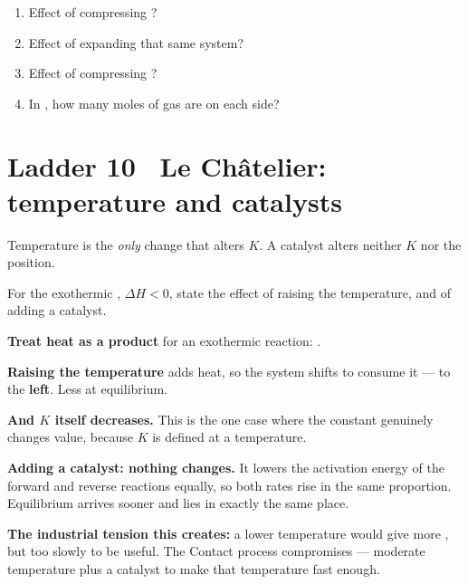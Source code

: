 \documentclass{apchem-worksheet}
\begin{document}
\begin{yourturn}
\begin{enumerate}[leftmargin=*,itemsep=0.5em]
  \item Effect of compressing ?
        \workspace[1.4cm]
  \item Effect of expanding that same system? \workspace[1.4cm]
  \item Effect of compressing ?
        \workspace[1.6cm]
  \item In , how many moles of gas are on
        each side? \workspace[1.6cm]
\end{enumerate}
\end{yourturn}

\section*{\sffamily Ladder 10 \textbullet\ Le Ch\^{a}telier: temperature and catalysts}

Temperature is the \emph{only} change that alters $K$. A catalyst alters
neither $K$ nor the position.

\begin{workedexample}
For the exothermic , $\Delta H < 0$, state the
effect of raising the temperature, and of adding a catalyst.

\textbf{Treat heat as a product} for an exothermic reaction:
.

\textbf{Raising the temperature} adds heat, so the system shifts to
consume it --- to the \textbf{left}. Less  at equilibrium.

\textbf{And $K$ itself decreases.} This is the one case where the constant
genuinely changes value, because $K$ is defined at a temperature.

\textbf{Adding a catalyst: nothing changes.} It lowers the activation
energy of the forward and reverse reactions equally, so both rates rise in
the same proportion. Equilibrium arrives sooner and lies in exactly the
same place.

\textbf{The industrial tension this creates:} a lower temperature would
give more , but too slowly to be useful. The Contact process
compromises --- moderate temperature plus a catalyst to make that
temperature fast enough.
\end{workedexample}
\end{document}
